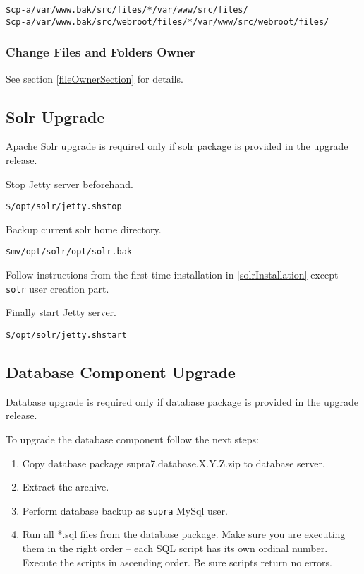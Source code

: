 \documentclass[12pt]{article}
\newcommand{\vigPackageName}{supra7}
\newcommand{\vigPathToProject}{/var/www}
\newcommand{\vigPathToSrc}{/src}
\newcommand{\vigReleaseVersion}{X.Y.Z}
\begin{document}
\begin{alltt}
\$ cp -a \vigPathToProject.bak\vigPathToSrc/files/* \vigPathToProject\vigPathToSrc/files/
\$ cp -a \vigPathToProject.bak\vigPathToSrc/webroot/files/* \vigPathToProject\vigPathToSrc/webroot/files/
\end{alltt}

\subsubsection{Change Files and Folders Owner}

See section \ref{fileOwnerSection} for details.

\subsection{Solr Upgrade}

Apache Solr upgrade is required only if solr package is provided in the upgrade release.

Stop Jetty server beforehand.

\begin{alltt}
\$ /opt/solr/jetty.sh stop
\end{alltt}

Backup current solr home directory.

\begin{alltt}
\$ mv /opt/solr /opt/solr.bak
\end{alltt}

Follow instructions from the first time installation in \ref{solrInstallation} except \texttt{solr} user creation part.

Finally start Jetty server.

\begin{alltt}
\$ /opt/solr/jetty.sh start
\end{alltt}

\subsection{Database Component Upgrade}

Database upgrade is required only if database package is provided in the upgrade release.

To upgrade the database component follow the next steps:

\begin{enumerate}
	\item Copy database package {\vigPackageName}.database.\vigReleaseVersion.zip to database server.
	\item Extract the archive.
	\item Perform database backup as \texttt{supra} MySql user.
	\item Run all *.sql files from the database package. Make sure you are executing them in the right order -- each SQL script has its own ordinal number. Execute the scripts in ascending order. Be sure scripts return no errors.
\end{enumerate}
\end{document}
